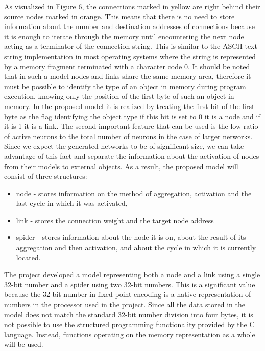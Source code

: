 As visualized in Figure 6, the connections marked in yellow are right behind their source 
nodes marked in orange. 
This means that there is no need to store information about the number and destination addresses 
of connections because it is enough to iterate through the memory until encountering the next 
node acting as a terminator of the connection string. 
This is similar to the ASCII text string implementation in most operating systems where the 
string is represented by a memory fragment terminated with a character code 0. 
It should be noted that in such a model nodes and links share the same memory area, 
therefore it must be possible to identify the type of an object in memory during program 
execution, knowing only the position of the first byte of such an object in memory. 
In the proposed model it is realized by treating the first bit of the first byte as the flag 
identifying the object type if this bit is set to 0 it is a node and if it is 1 it is a link. 
The second important feature that can be used is the low ratio of active neurons to the total 
number of neurons in the case of larger networks. Since we expect the generated networks to be 
of significant size, we can take advantage of this fact and separate the information about the 
activation of nodes from their models to external objects. 
As a result, the proposed model will consist of three structures: 
\begin{itemize}
	\item node - stores information on the method of aggregation,
		activation and the last cycle in which it was activated,
	\item link - stores the connection weight and the target node address
	\item spider - stores information about the node it is on, about the result of its
		aggregation and then activation, and about the cycle in which it is currently located.
\end{itemize}

The project developed a model representing both a node and a link using a single 32-bit number and 
a spider using two 32-bit numbers. 
This is a significant value because the 32-bit number in fixed-point encoding is a native 
representation of numbers in the processor used in the project. 
Since all the data stored in the model does not match the standard 32-bit number division into 
four bytes, it is not possible to use the structured programming functionality provided by the 
C language. Instead, functions operating on the memory representation as a whole will be used.

